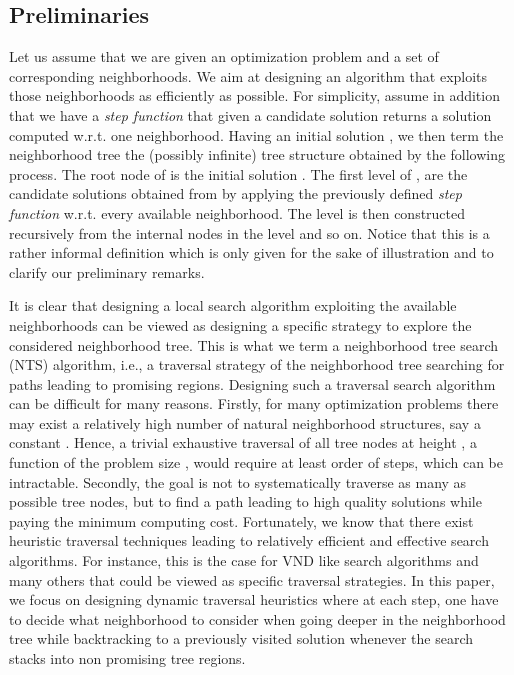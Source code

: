 \documentclass{acm_proc_article-sp}
\begin{document}
\subsection{Preliminaries}
Let us assume that we are given an optimization problem and a set of corresponding neighborhoods. We aim at designing an algorithm that exploits those neighborhoods as efficiently as possible. For simplicity, assume in addition that we have a \emph{step function} that given a candidate solution  returns a solution  computed w.r.t. one neighborhood. Having an initial solution , we then term the neighborhood tree  the (possibly infinite) tree structure obtained by the following process. The root node of  is the initial solution . The first level of , are the candidate solutions obtained from  by applying the previously defined \emph{step function} w.r.t. every available neighborhood. The  level is then constructed recursively from the internal nodes in the  level and so on. Notice that this is a rather informal definition which is only given for the sake of illustration and to clarify our preliminary remarks.

It is clear that designing a local search algorithm exploiting the available neighborhoods can be viewed as designing a specific strategy to explore the considered neighborhood tree. This is what we term a neighborhood tree search (NTS) algorithm, i.e., a traversal strategy of the neighborhood tree searching for paths leading to promising regions. Designing such a traversal search algorithm can be difficult for many reasons. Firstly, for many optimization problems there may exist a relatively high number of natural neighborhood structures, say a constant . Hence, a trivial exhaustive traversal of all tree nodes at height , a function of the problem size , would require at least order of  steps, which can be intractable. Secondly, the goal is not to systematically traverse as many as possible tree nodes, but to find a path leading to high quality solutions while paying the minimum computing cost. Fortunately, we know that there exist heuristic traversal techniques leading to relatively efficient and effective search algorithms. For instance, this is the case for VND like search algorithms and many others that could be viewed as specific traversal strategies. In this paper, we focus on designing dynamic traversal heuristics where at each step, one have to decide what neighborhood to consider when going deeper in the neighborhood tree while backtracking to a previously visited solution whenever the search stacks into non promising tree regions.
\end{document}
